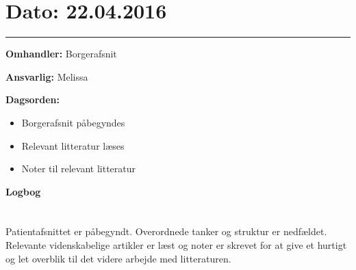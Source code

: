 

\section{Dato: 22.04.2016}
\hrule

\textbf{Omhandler:} Borgerafsnit

\textbf{Ansvarlig:} Melissa

\textbf{Dagsorden:}
\begin{itemize}
	\item Borgerafsnit påbegyndes
	\item Relevant litteratur læses
	\item Noter til relevant litteratur
\end{itemize}

\textbf{Logbog}
\\
\\ \\
Patientafsnittet er påbegyndt. Overordnede tanker og struktur er nedfældet. Relevante videnskabelige artikler er læst og noter er skrevet for at give et hurtigt og let overblik til det videre arbejde med litteraturen.



